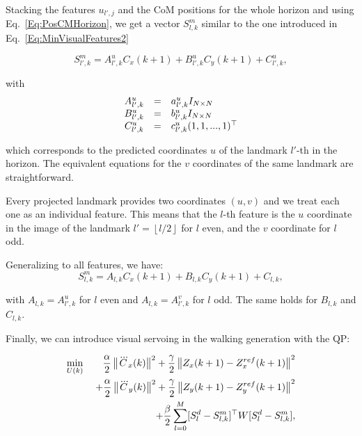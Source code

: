Stacking the features $u_{l',j}$ and the CoM positions for the whole horizon and using Eq.~\ref{Eq:PosCMHorizon}, we get a vector $S^m_{l,k}$ similar to the one introduced in Eq.~\ref{Eq:MinVisualFeatures2} 

\begin{equation*}
S^m_{l',k} = A^u_{l',k} C_x(k+1) + B^u_{l',k} C_y(k+1) + C_{l',k}^u,
\end{equation*}

\noindent with 
$$
\begin{array}{ccl}
A^u_{l',k} &=& a^u_{l',k} I_{N\times N}\\
B^u_{l',k} &=& b^u_{l',k} I_{N\times N}\\
C_{l',k}^u &=& c^u_{l',k} (1,1,...,1)^{\top}
\end{array}
$$

 \noindent which corresponds to the predicted coordinates $u$ of the landmark $l'$-th in the horizon.
The equivalent equations for the $v$ coordinates of the same landmark are straightforward.

Every projected landmark provides two coordinates $(u,v)$ and we treat each one as an individual feature. This means that the $l$-th feature is the $u$ coordinate in the image of the landmark $l' = \left \lfloor l/2 \right \rfloor$ for $l$ even, and the $v$ coordinate for $l$ odd.

Generalizing to all features, we have:
\begin{equation}
\label{Eq:FeaturesStacked}
 S^m_{l,k} = A_{l,k} C_x(k+1) + B_{l,k} C_y(k+1) + C_{l,k},
\end{equation}

\noindent with $A_{l,k} = A^u_{l',k}$ for $l$ even and $A_{l,k} = A^v_{l',k}$ for $l$ odd. The same holds for $B_{l,k}$ and $C_{l,k}$.

Finally, we can introduce visual servoing in the walking generation with the QP:

\begin{eqnarray*}
\label{Eq:MainQP}
\nonumber
 \min_{U(k)} \; && \dfrac{\alpha}{2} \left\| \dddot{C}_x(k) \right\|^2
 + \dfrac{\gamma}{2} \left\| Z_x(k+1) - Z_x^{ref}(k+1) \right\|^2 \\
 \nonumber
 && + \dfrac{\alpha}{2} \left\| \dddot{C}_y(k) \right\|^2
 + \dfrac{\gamma}{2} \left\| Z_y(k+1) - Z_y^{ref}(k+1) \right\|^2 \\
 \nonumber
 && + \dfrac{\beta}{2} \sum\limits_{l=0}^{M}  [S^d_{l}- S^m_{l,k}]^{\top} W [S^d_{l} - S^m_{l,k}],
\end{eqnarray*}

